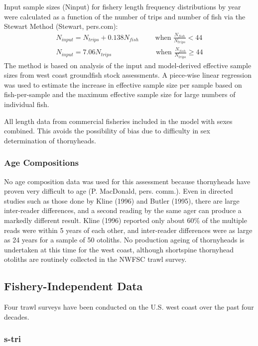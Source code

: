\documentclass[11pt,
  english,
  letterpaper,
]{article}
\begin{document}
Input sample sizes (Ninput) for fishery length frequency distributions by year were calculated as a function of the number of trips and number of fish via the Stewart Method (Stewart, pers.com): \begin{align*}{N_{input} = N_{trips} + 0.138N_{fish}}\qquad\text{ when }\frac{N_{fish}}{N_{trips}}<44 \\
{N_{input} = 7.06N_{trips}}\qquad\qquad\qquad\text{ when }\frac{N_{fish}}{N_{trips}}\ge 44 \end{align*} The method is based on analysis of the input and model-derived effective sample sizes from west coast groundfish stock assessments. A piece-wise linear regression was used to estimate the increase in effective sample size per sample based on fish-per-sample and the maximum effective sample size for large numbers of individual fish.

All length data from commercial fisheries included in the model with sexes combined. This avoids the possibility of bias due to difficulty in sex determination of thornyheads.

\hypertarget{age-compositions}{%
\subsubsection{Age Compositions}\label{age-compositions}}

No age composition data was used for this assessment because thornyheads have proven very difficult to age (P. MacDonald, pers. comm.). Even in directed studies such as those done by Kline (1996) and Butler (1995), there are large inter-reader differences, and a second reading by the same ager can produce a markedly different result. Kline (1996) reported only about 60\% of the multiple reads were within 5 years of each other, and inter-reader differences were as large as 24 years for a sample of 50 otoliths. No production ageing of thornyheads is undertaken at this time for the west coast, although shortspine thornyhead otoliths are routinely collected in the NWFSC trawl survey.

\hypertarget{fishery-independent-data}{%
\subsection{Fishery-Independent Data}\label{fishery-independent-data}}

Four trawl surveys have been conducted on the U.S. west coast over the past four decades.

\hypertarget{section}{%
\subsubsection{\texorpdfstring{\acrlong{s-tri}}{}}\label{section}}
\end{document}
